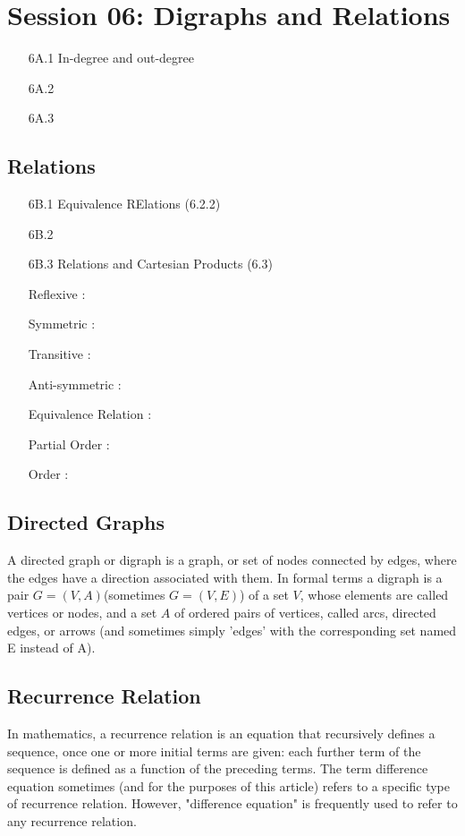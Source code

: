 \documentclass{article}
\begin{document}
\section*{Session 06: Digraphs and Relations}
\begin{itemize}
\item[6A.1] In-degree and out-degree
\item[6A.2]
\item[6A.3]
\end{itemize}
\subsection*{Relations}
\begin{itemize}
\item[6B.1] Equivalence RElations (6.2.2)
\item[6B.2]
\item[6B.3] Relations and Cartesian Products (6.3)
\end{itemize}


\begin{itemize}
\item[Reflexive]: 
\item[Symmetric]: 
\item[Transitive]: 
\item[Anti-symmetric]: 
\item[Equivalence Relation]: 
\item[Partial Order]:
\item[Order]:
\end{itemize}
\newpage
\subsection*{Directed Graphs}
A directed graph or digraph is a graph, or set of nodes connected by edges, where the edges have a direction associated with them. In formal terms a digraph is a pair $G=(V,A)$(sometimes $G=(V,E)$) of a set $V$, whose elements are called vertices or nodes, and a set $A$ of ordered pairs of vertices, called arcs, directed edges, or arrows (and sometimes simply 'edges' with the corresponding set named E instead of A).


\subsection*{Recurrence Relation}
In mathematics, a recurrence relation is an equation that recursively defines a sequence, once one or more initial terms are given: each further term of the sequence is defined as a function of the preceding terms.
The term difference equation sometimes (and for the purposes of this article) refers to a specific type of recurrence relation. However, "difference equation" is frequently used to refer to any recurrence relation.
\end{document}

